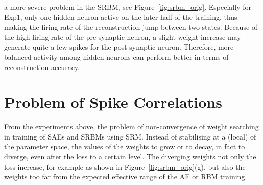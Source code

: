 {%
}
{%
}

\DIFdelend \DIFaddbegin {}\DIFaddend a more severe problem in the SRBM, see Figure~\ref{fig:srbm_orig}.
Especially for Exp1, only one hidden neuron \DIFdelbegin {}\DIFdelend \DIFaddbegin {}\DIFaddend active on the later half of the training, thus making the firing rate of the reconstruction jump between two states.
Because of the high firing rate of the pre-synaptic neuron, a slight weight increase may generate quite a few spikes for the post-synaptic neuron.
Therefore, more balanced activity among hidden neurons can perform better in terms of reconstruction accuracy.

\section{Problem of Spike Correlations	}
\label{sec:problem}
From the experiments above, the problem of \DIFaddbegin {}\DIFaddend non-convergence of weight searching \DIFdelbegin {}\DIFdelend \DIFaddbegin {}\DIFaddend in training of SAEs and SRBMs using SRM.
Instead of stabilising at a (local) \DIFdelbegin {}\DIFdelend \DIFaddbegin {}\DIFaddend of the parameter space, the values of the weights \DIFdelbegin {}\DIFdelend \DIFaddbegin {}\DIFaddend to grow or to decay, in fact to diverge, even after the loss \DIFdelbegin {}\DIFdelend \DIFaddbegin {}\DIFaddend to a certain level.
The diverging weights not only \DIFdelbegin {}\DIFdelend \DIFaddbegin {}\DIFaddend the loss increase, for example as shown in Figure~\ref{fig:srbm_orig}(g), but also \DIFdelbegin {}\DIFdelend \DIFaddbegin {}\DIFaddend the weights too far from the expected effective range of the \DIFaddbegin {}\DIFaddend AE or RBM training.

